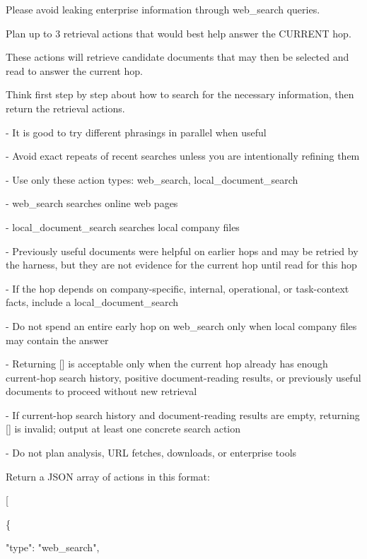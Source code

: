 \begin{tcolorbox}
\begin{scriptsize}
Please avoid leaking enterprise information through web\_search queries.\par
\mbox{}\par
\mbox{}\par
Plan up to 3 retrieval actions that would best help answer the CURRENT hop.\par
These actions will retrieve candidate documents that may then be selected and read to answer the current hop.\par
Think first step by step about how to search for the necessary information, then return the retrieval actions.\par
\mbox{}\par
- It is good to try different phrasings in parallel when useful\par
- Avoid exact repeats of recent searches unless you are intentionally refining them\par
- Use only these action types: web\_search, local\_document\_search\par
- web\_search searches online web pages\par
- local\_document\_search searches local company files\par
- Previously useful documents were helpful on earlier hops and may be retried by the harness, but they are not evidence for the current hop until read for this hop\par
- If the hop depends on company-specific, internal, operational, or task-context facts, include a local\_document\_search\par
- Do not spend an entire early hop on web\_search only when local company files may contain the answer\par
- Returning [] is acceptable only when the current hop already has enough current-hop search history, positive document-reading results, or previously useful documents to proceed without new retrieval\par
- If current-hop search history and document-reading results are empty, returning [] is invalid; output at least one concrete search action\par
- Do not plan analysis, URL fetches, downloads, or enterprise tools\par
\mbox{}\par
Return a JSON array of actions in this format:\par
[\par
  \{\par
    "type": "web\_search",\par

\end{scriptsize}
\end{tcolorbox}
